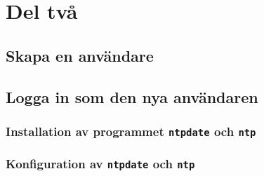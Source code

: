 %
%
%


\section{Del två}


\subsection{Skapa en användare}


\subsection{Logga in som den nya användaren}

\subsubsection{Installation av programmet \texttt{ntpdate} och \texttt{ntp}}

\subsubsection{Konfiguration av \texttt{ntpdate} och \texttt{ntp}}
%


